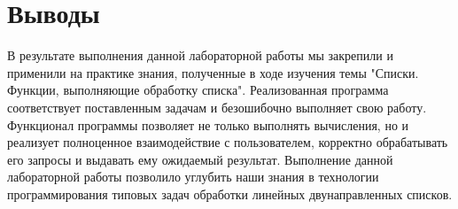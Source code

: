 \section*{Выводы}

В результате выполнения данной лабораторной работы мы закрепили и применили на практике знания,
полученные в ходе изучения темы
"Списки.
Функции, выполняющие обработку списка".
Реализованная программа соответствует поставленным задачам и безошибочно выполняет свою работу.
Функционал программы позволяет не только выполнять вычисления, но и реализует полноценное взаимодействие
с пользователем, корректно обрабатывать его запросы и выдавать ему
ожидаемый результат.
Выполнение данной лабораторной работы позволило
углубить наши знания в технологии программирования типовых
задач обработки линейных
двунаправленных списков.